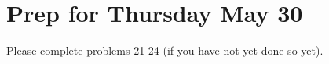 \documentclass[letterpaper,oneside]{book}%
\theoremstyle{plain}
\theoremstyle{box}
\theoremstyle{problem}
\newtheorem*{hwenum*}{Home Work Practice}
\newenvironment{hw*}[1][]{\begin{hwenum*}[#1]}{\end{hwenum*}\nopagebreak\hrule\bigskip}
\begin{document}
\section{Prep for Thursday May 30}

\begin{hw*}
 Please complete problems 21-24 (if you have not yet done so yet).
\end{hw*}

















\end{document}
